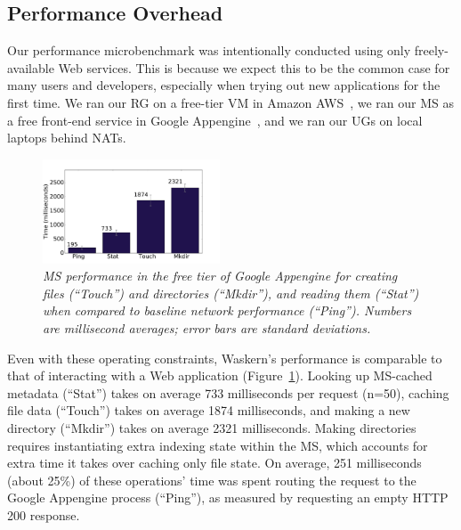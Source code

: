 \subsection{Performance Overhead}

Our performance microbenchmark was intentionally conducted using only
freely-available Web services.  This is because we expect this to be the common
case for many users and developers, especially when trying out new applications
for the first time.  We ran our RG on a free-tier VM in Amazon
AWS~\cite{amazonaws}, we ran our MS as a free front-end service in Google
Appengine~\cite{google-appengine}, and we ran our UGs on local laptops behind
NATs.

\begin{figure}[t!]
\centering
\includegraphics[width=0.47\textwidth]{figures/ms-performance}
\caption{\it MS performance in the free tier of Google Appengine for creating
   files (``Touch'') and directories (``Mkdir''), and reading them
   (``Stat'') when compared to baseline network performance (``Ping''). 
   Numbers are millisecond averages; error bars are standard deviations.}
\label{fig:ms-performance}
\end{figure}

Even with these operating constraints, Waskern's performance is comparable to
that of interacting with a Web application (Figure~\ref{fig:ms-performance}).
Looking up MS-cached metadata
(``Stat'') takes on average 733 milliseconds per request (n=50), caching
file data (``Touch'') takes on average 1874 milliseconds, and making a new
directory (``Mkdir'') takes on average 2321 milliseconds.  Making directories
requires instantiating extra indexing state within the MS, which accounts
for extra time it takes over caching only file state.  On average, 251
milliseconds (about 25\%) of these operations' time was spent routing the request to the Google
Appengine process (``Ping''), as measured by requesting an empty HTTP 200
response.

